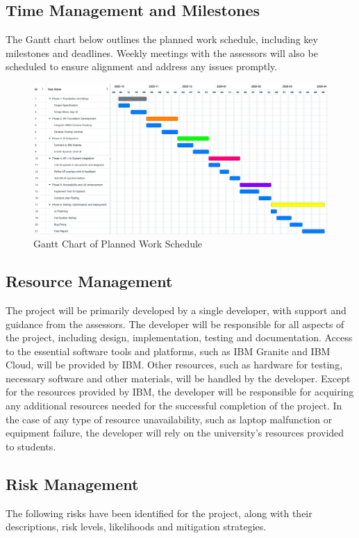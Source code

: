 \documentclass[12pt]{article}
\begin{document}
    \subsection{Time Management and Milestones}
        The Gantt chart below outlines the planned work schedule, including key milestones and deadlines. Weekly meetings with the assessors will also be scheduled to ensure alignment and address any issues promptly.

        \begin{figure}[H]
        \centering
        \includegraphics[width=\textwidth]{img/GanttChart.png}
        \caption{Gantt Chart of Planned Work Schedule}
        \label{fig:GanttChart}
        \end{figure}

    \subsection{Resource Management}

    The project will be primarily developed by a single developer, with support and guidance from the assessors. The developer will be responsible for all aspects of the project, including design, implementation, testing and documentation.
    Access to the essential software tools and platforms, such as IBM Granite and IBM Cloud, will be provided by IBM. Other resources, such as hardware for testing, necessary software and other materials, will be handled by the developer. Except for the
    resources provided by IBM, the developer will be responsible for acquiring any additional resources needed for the successful completion of the project. In the case of any type of resource unavailability, such as laptop malfunction or equipment failure, the
    developer will rely on the university's resources provided to students.


    \subsection{Risk Management}
    The following risks have been identified for the project, along with their descriptions, risk levels, likelihoods and mitigation strategies.
\end{document}
